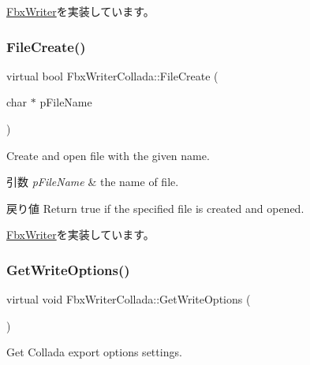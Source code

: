 \hyperlink{class_fbx_writer_a0387142f55d0020fd5360759c12aa121}{Fbx\+Writer}を実装しています。

\mbox{\label{class_fbx_writer_collada_a973e285681d8486e74a200812eeee70a}} 
\subsubsection{\texorpdfstring{File\+Create()}{FileCreate()}}
{\footnotesize\ttfamily virtual bool Fbx\+Writer\+Collada\+::\+File\+Create (\begin{DoxyParamCaption}\item[{char $\ast$}]{p\+File\+Name }\end{DoxyParamCaption})\hspace{0.3cm}{\ttfamily [virtual]}}

Create and open file with the given name. 
\begin{DoxyParams}{引数}
{\em p\+File\+Name} & the name of file. \\
\hline
\end{DoxyParams}
\begin{DoxyReturn}{戻り値}
Return true if the specified file is created and opened. 
\end{DoxyReturn}


\hyperlink{class_fbx_writer_abe6729227cd6e3be5ee3ab0c1b8b0eda}{Fbx\+Writer}を実装しています。

\mbox{\label{class_fbx_writer_collada_a64fdc18e00335c37acf279a5ef0d3711}} 
\subsubsection{\texorpdfstring{Get\+Write\+Options()}{GetWriteOptions()}}
{\footnotesize\ttfamily virtual void Fbx\+Writer\+Collada\+::\+Get\+Write\+Options (\begin{DoxyParamCaption}{ }\end{DoxyParamCaption})\hspace{0.3cm}{\ttfamily [virtual]}}

Get Collada export options settings. 

